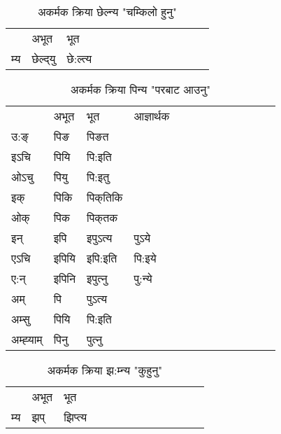 \begin{table}[H]
\centering
\caption{\label{elt.vt} अकर्मक क्रिया  छेल्न्य  "चम्किलो हुनु"  }
\begin{tabular}{l|l|l|l|l|l|l|l|l|l|l|l|l}  \toprule
&अभूत & भूत   \\ 
म्य & छेल्द्‌यु  & छे:ल्त्य  \\ 
\bottomrule
\end{tabular}
\end{table}


\begin{table}[H]
\centering
\caption{\label{i.vi} अकर्मक क्रिया  पिन्य  "परबाट आउनु"  }
\begin{tabular}{l|l|l|l|l|l|l|l|l|l|l|l|l}  \toprule
&अभूत & भूत & आज्ञार्थक \\ 
उ:ङ्‌ &पिङ &पिङत \\ 
इऽचि &पियि &पि:इति   \\ 
ओऽचु &पियु &पि:इतु   \\ 
इक् &पिकि &पिक्‌तिकि   \\ 
ओक् &पिक &पिक्‌तक   \\ 
इन् & इपि & इपुऽत्य &पुऽये  \\ 
एऽचि & इपियि & इपि:इति &पि:इये    \\ 
ए:न् & इपिनि  & इपुत्‍नु &पु:न्ये  \\ 
अम् & पि & पुऽत्य   \\ 
अम्सु & पियि & पि:इति     \\ 
अम्ह्‍याम् & पिनु  & पुत्‍नु \\ 
\bottomrule
\end{tabular}
\end{table}


\begin{table}[H]
\centering
\caption{\label{ip.vi} अकर्मक क्रिया  झ:म्‍न्य  "कुहुनु"  }
\begin{tabular}{l|l|l|l|l|l|l|l|l|l|l|l|l}  \toprule
&अभूत & भूत   \\ 
म्य & झप् & झिप्‍त्य   \\ 
\bottomrule
\end{tabular}
\end{table}


